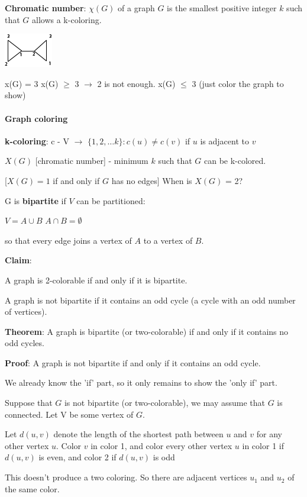 \documentclass[9pt, letterpaper, oneside]{article}
\begin{document}
\textbf{Chromatic number}: $\chi(G)$ of a graph $G$ is the smallest positive integer $k$ such that $G$ allows a k-coloring.

\includegraphics{fig24.png}

x(G) = 3
x(G) $\geq$ 3 $\to$ 2 is not enough.
x(G) $\leq$ 3 (just color the graph to show)

\paragraph{Graph coloring}

\textbf{k-coloring}: c - V $\to$ $\{1, 2, \ldots k\}: c(u) \neq c(v)$ if $u$ is adjacent to $v$

$X(G)$ [chromatic number] \-- minimum $k$ such that $G$ can be k-colored.

[$X(G) = 1$ if and only if $G$ has no edges]
When is $X(G)$ = 2?

G is \textbf{bipartite} if $V$ can be partitioned:

$V = A \cup B$
$A \cap B = \emptyset$

so that every edge joins a vertex of $A$ to a vertex of $B$.

\textbf{Claim}:

A graph is 2-colorable if and only if it is bipartite.

A graph is not bipartite if it contains an odd cycle (a cycle with an odd number of vertices).

\textbf{Theorem}: A graph is bipartite (or two-colorable) if and only if it contains no odd cycles.

\textbf{Proof}: A graph is not bipartite if and only if it contains an odd cycle.

We already know the 'if' part, so it only remains to show the 'only if' part.

Suppose that $G$ is not bipartite (or two-colorable), we may assume that $G$ is connected. Let V be some vertex of $G$. 

Let $d(u,v)$ denote the length of the shortest path between $u$ and $v$ for any other vertex $u$. Color $v$ in color 1, and color every other vertex $u$ in color 1 if $d(u,v)$ is even, and color 2 if $d(u,v)$ is odd

This doesn't produce a two coloring. So there are adjacent vertices $u_1$ and $u_2$ of the same color.
\end{document}
